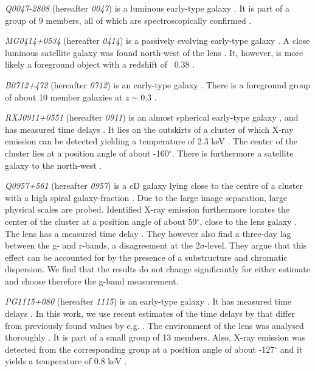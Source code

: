 \documentclass[useAMS,usenatbib]{mn2e}
\begin{document}
\textit{Q0047-2808} (hereafter \textit{0047}) is a luminous early-type galaxy \citep{1996MNRAS.278..139W}. It is part of a group of 9 members, all of which are spectroscopically confirmed \citep{2011ApJ...726...84W}.

\textit{MG0414+0534} (hereafter \textit{0414}) is a passively evolving early-type galaxy \citep{1999AJ....117.2034T}. A close luminous satellite galaxy was found north-west of the lens \citep{1993AJ....105....1S}. It, however, is more likely a foreground object with a redshift of ~0.38 \citep{2011MNRAS.413L..86C}.

\textit{B0712+472} (hereafter \textit{0712}) is an early-type galaxy \citep{1998MNRAS.296..483J,1998AJ....115..377F}. There is a foreground group of about 10 member galaxies at $z\sim0.3$ \citep{2002AJ....123..627F}.

\textit{RXJ0911+0551} (hereafter \textit{0911}) is an almost spherical early-type galaxy \citep{1997A&A...317L..13B,2012A&A...538A..99S}, and has measured time delays \citep{2002ApJ...572L..11H}. It lies on the outskirts of a cluster of which X-ray emission can be detected yielding a temperature of 2.3 keV \citep{2001ApJ...555....1M}. The center of the cluster lies at a position angle of about -160$^{\circ}$. There is furthermore a satellite galaxy to the north-west \citep{2000ApJ...544L..35K}.

\textit{Q0957+561} (hereafter \textit{0957}) is a cD galaxy lying close to the centre of a cluster with a high spiral galaxy-fraction \citep[e.g.][]{1992MNRAS.254P..27G,1994A&A...291..411A,1998ApJ...504..661C}. Due to the large image separation, large physical scales are probed. Identified X-ray emission furthermore locates the center of the cluster at a position angle of about 59$^{\circ}$, close to the lens galaxy \citep{2002ApJ...565...96C}. The lens has a measured time delay \citep[e.g.][]{2012A&A...540A.132S}. They however also find a three-day lag between the g- and r-bands, a disagreement at the 2$\sigma$-level. They argue that this effect can be accounted for by the presence of a substructure and chromatic dispersion. We find that the results do not change significantly for either estimate and choose therefore the g-band measurement.

\textit{PG1115+080} (hereafter \textit{1115}) is an early-type galaxy \citep{1980Natur.285..641W,2005ApJ...626...51Y}. It has measured time delays \citep[see e.g.][]{1997ApJ...475L..85S}. In this work, we use recent estimates of the time delays by \citet{2010MNRAS.406.2764T} that differ from previously found values by e.g. \citet{1997ApJ...489...21B}. The environment of the lens was analysed thoroughly \citep{2006ApJ...641..169M,2011ApJ...726...84W}. It is part of a small group of 13 members. Also, X-ray emission was detected from the corresponding group at a position angle of about -127$^{\circ}$ and it yields a temperature of 0.8 keV \citep{2004ApJ...610..686G}.
\end{document}
